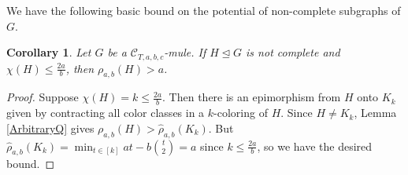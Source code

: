 \documentclass[12pt]{amsart}
\theoremstyle{plain}
\newtheorem{cor}[thm]{Corollary}
\theoremstyle{definition}
\newtheorem{defn}{Definition}
\theoremstyle{remark}
\newcommand{\fancy}[1]{\mathcal{#1}}
\newcommand{\C}{\fancy{C}}
\newcommand{\set}[1]{\left\{ #1 \right\}}
\newcommand{\setbs}[2]{\left\{ #1 \mid #2 \right\}}
\newcommand{\card}[1]{\left|#1\right|}
\newcommand{\irange}[1]{\left[#1\right]}
\newcommand{\parens}[1]{\left( #1 \right)}
\newcommand{\brackets}[1]{\left[ #1 \right]}
\newcommand{\DefinedAs}{\mathrel{\mathop:}=}
\begin{document}
We have the following basic bound on the potential of non-complete subgraphs of $G$.
\begin{cor}\label{CompleteQ}
Let $G$ be a $\C_{T,a,b,c}$-mule. If $H \unlhd G$ is not complete and $\chi(H) \le \frac{2a}{b}$, then $\rho_{a,b}(H) > a$.
\end{cor}
\begin{proof}
Suppose $\chi(H) = k \le \frac{2a}{b}$.  Then there is an epimorphism from $H$ onto $K_k$ given by contracting all color classes in a $k$-coloring of $H$.  Since $H \ne K_k$, Lemma \ref{ArbitraryQ} gives
$\rho_{a,b}(H) > \hat{\rho}_{a,b}(K_k)$.  But $\hat{\rho}_{a,b}(K_k) = \min_{t \in \irange{k}} at - b\binom{t}{2} = a$ since $k \le \frac{2a}{b}$, so we have the desired bound.
\end{proof}

%
%
\end{document}
